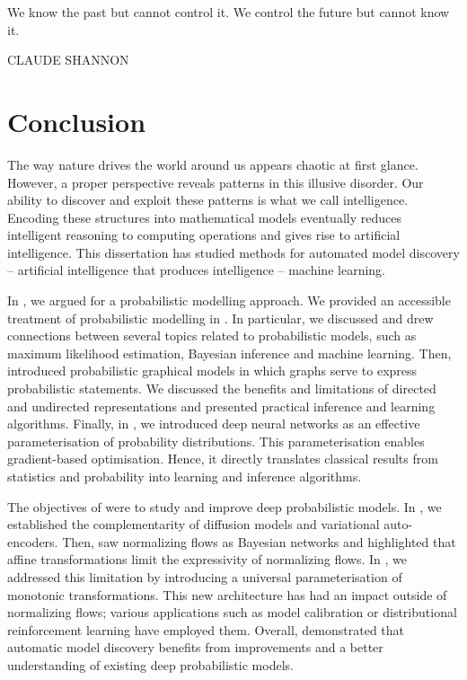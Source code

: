 \null\vfill
{\centering
\parbox{\textwidth}{%
  \raggedright
  {%

  We know the past but cannot control it. We control the future but cannot know it.\par\bigskip
  }
  \raggedleft\MakeUppercase{Claude Shannon}\par%
}}

\vfill\vfill


\chapter{Conclusion}\label{ch:08}
The way nature drives the world around us appears chaotic at first glance. However, a proper perspective reveals patterns in this illusive disorder. Our ability to discover and exploit these patterns is what we call intelligence. Encoding these structures into mathematical models eventually reduces intelligent reasoning to computing operations and gives rise to artificial intelligence. This dissertation has studied methods for automated model discovery -- artificial intelligence that produces intelligence -- machine learning.

In , we argued for a probabilistic modelling approach. We provided an accessible treatment of probabilistic modelling in . In particular, we discussed and drew connections between several topics related to probabilistic models, such as maximum likelihood estimation, Bayesian inference and machine learning. Then,  introduced probabilistic graphical models in which graphs serve to express probabilistic statements. We discussed the benefits and limitations of directed and undirected representations and presented practical inference and learning algorithms. Finally, in , we introduced deep neural networks as an effective parameterisation of probability distributions. This parameterisation enables gradient-based optimisation. Hence, it directly translates classical results from statistics and probability into learning and inference algorithms.

The objectives of  were to study and improve deep probabilistic models. In , we established the complementarity of diffusion models and variational auto-encoders. Then,  saw normalizing flows as Bayesian networks and highlighted that affine transformations limit the expressivity of normalizing flows. In , we addressed this limitation by introducing a universal parameterisation of monotonic transformations. This new architecture has had an impact outside of normalizing flows; various applications such as model calibration or distributional reinforcement learning have employed them. Overall,  demonstrated that automatic model discovery benefits from improvements and a better understanding of existing deep probabilistic models.

